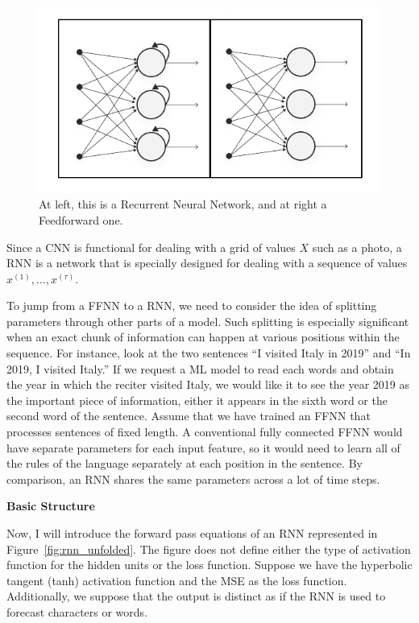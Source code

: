 \begin{figure}[H]
    \centering
    \includegraphics[scale=0.6]{./images/background/rnn.png}
    \caption{At left, this is a Recurrent Neural Network, and at right a Feedforward one.}
    \label{fig:rnn}
\end{figure}

Since a CNN is functional for dealing with a grid of values $X$ such as a photo,
a RNN is a network that is specially designed for dealing with a sequence of
values $x^{(1)} , \ldots , x^{(\tau)}$.

To jump from a FFNN to a RNN, we need to consider the idea of splitting parameters through other parts of a model.
Such splitting is especially significant when an exact chunk of information can happen at various positions within the sequence.
For instance, look at  the two sentences “I visited Italy in 2019” and “In 2019, I visited Italy.”
If we request a ML model to read each words and obtain the year in which the reciter visited Italy, we would like it to see
the year 2019 as the important piece of information, either it appears in the sixth word or the second word of the sentence.
Assume that we have trained an FFNN that processes sentences of fixed length.
A conventional fully connected FFNN would have separate parameters for each input feature, so it would need to learn
all of the rules of the language separately at each position in the sentence.
By comparison, an RNN shares the same parameters across a lot of time steps.


{\large \textbf{Basic Structure}}

Now, I will introduce the forward pass equations of an RNN represented in Figure~\ref{fig:rnn_unfolded}.
The figure does not define either the type of activation function for the hidden units or the loss function.
Suppose we have the hyperbolic tangent (tanh) activation function and the MSE as the loss function.
Additionally, we suppose that the output is distinct as if the RNN is used to forecast characters or words.

